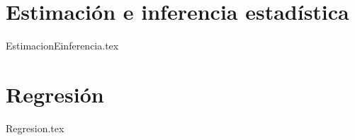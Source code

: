 \section{Estimaci\'on e inferencia estad\'istica}
{EstimacionEinferencia.tex}
\section{Regresi\'on}
{Regresion.tex}
